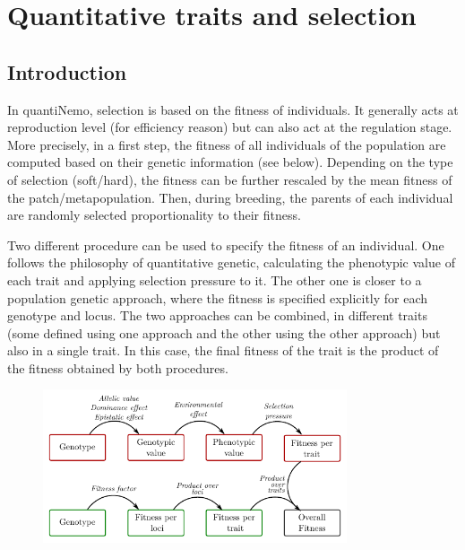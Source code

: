 \documentclass[letterpaper,12pt,oneside]{book}
\begin{document}
\chapter{Quantitative traits and selection}\label{chap:QuantitativeTraitsAndSelection}
\section{Introduction}
In quantiNemo,  selection is based on the fitness of individuals. It generally acts at reproduction level (for efficiency reason) but can also act at the regulation stage. 
More precisely, in a first step, the fitness of all individuals of the population are computed based on their genetic information (see below). Depending on the type of selection (soft/hard), the fitness can be further rescaled by the mean fitness of the patch/metapopulation. Then, during breeding, the parents of each individual are randomly selected proportionality to their fitness.  

Two different procedure can be used to specify the fitness of an individual. One follows the philosophy of quantitative genetic, calculating the phenotypic value of each trait and applying selection pressure to it. The other one is closer to a population genetic approach, where the fitness is specified explicitly for each genotype and locus. The two approaches can be combined, in different traits (some defined using one approach and the other using the other approach) but also in a single trait. In this case, the final fitness of the trait is the product of the fitness obtained by both procedures. 
\begin{figure}[h]
    \centering
        \includegraphics[width=0.80\textwidth]{selection.pdf}
    \label{fig:Selection}
\end{figure}
\end{document}
